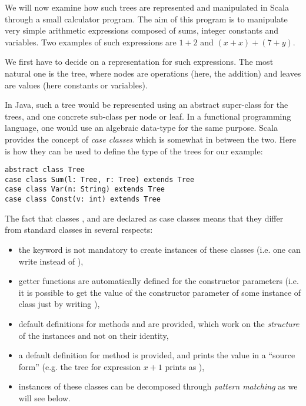 \documentclass[a4paper,12pt,twoside,titlepage]{article}
\newcommand{\langname}[1]{#1\xspace}
\newcommand{\Scala}{\langname{Scala}}
\newcommand{\Java}{\langname{Java}}
\begin{document}
We will now examine how such trees are represented and manipulated in
\Scala through a small calculator program. The aim of this program is
to manipulate very simple arithmetic expressions composed of sums,
integer constants and variables. Two examples of such expressions are
$1+2$ and $(x+x)+(7+y)$.

We first have to decide on a representation for such expressions. The
most natural one is the tree, where nodes are operations (here, the
addition) and leaves are values (here constants or variables).

In \Java, such a tree would be represented using an abstract
super-class for the trees, and one concrete sub-class per node or
leaf. In a functional programming language, one would use an algebraic
data-type for the same purpose. \Scala provides the concept of
\emph{case classes} which is somewhat in between the two. Here is how
they can be used to define the type of the trees for our example:
\begin{lstlisting}
abstract class Tree
case class Sum(l: Tree, r: Tree) extends Tree
case class Var(n: String) extends Tree
case class Const(v: int) extends Tree
\end{lstlisting}
The fact that classes ,  and  are
declared as case classes means that they differ from standard classes
in several respects:
\begin{itemize}
\item the  keyword is not mandatory to create instances of
  these classes (i.e. one can write  instead of
  ),
\item getter functions are automatically defined for the constructor
  parameters (i.e. it is possible to get the value of the 
  constructor parameter of some instance  of class
   just by writing ),
\item default definitions for methods  and
   are provided, which work on the \emph{structure} of
  the instances and not on their identity,
\item a default definition for method  is provided, and
  prints the value in a ``source form'' (e.g. the tree for expression
  $x+1$ prints as ),
\item instances of these classes can be decomposed through
  \emph{pattern matching} as we will see below.
\end{itemize}
\end{document}

